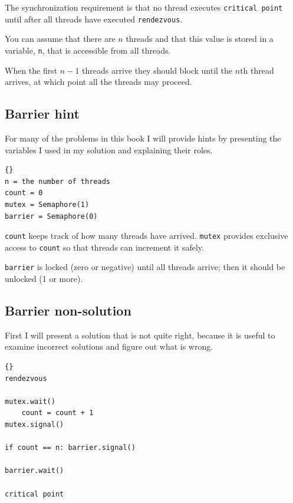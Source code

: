 \documentclass{book}
\newcommand{\clearemptydoublepage}{\newpage\cleardoublepage}
\begin{document}
The synchronization requirement is that
no thread executes {\tt critical point} until after all
threads have executed {\tt rendezvous}.

You can assume that there are $n$
threads and that this value is stored in a variable, {\tt n},
that is accessible from all threads.

When the first $n-1$ threads arrive they should block until the $n$th
thread arrives, at which point all the threads may proceed.


\clearemptydoublepage
\subsection {Barrier hint}

For many of the problems in this book I will provide hints
by presenting the variables I used in my solution and
explaining their roles.

\begin{latin}
\begin{latin}
\begin{lstlisting}[title={Barrier hint}]{}
n = the number of threads
count = 0
mutex = Semaphore(1)
barrier = Semaphore(0)
\end{lstlisting}
\end{latin}
\end{latin}

{\tt count} keeps track of how many threads have arrived.
{\tt mutex} provides exclusive access to {\tt count} so that
threads can increment it safely.

{\tt barrier} is locked
(zero or negative) until all threads arrive; then it should
be unlocked (1 or more).


\clearemptydoublepage
\subsection {Barrier non-solution}

First I will present a solution that is not quite right, because
it is useful to examine incorrect solutions and figure out what
is wrong.

\begin{latin}
\begin{latin}
\begin{lstlisting}[title={Barrier non-solution}]{}
rendezvous

mutex.wait()
    count = count + 1
mutex.signal()

if count == n: barrier.signal()

barrier.wait()

critical point
\end{lstlisting}
\end{latin}
\end{latin}
\end{document}

